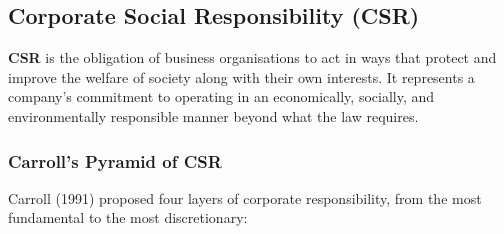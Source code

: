 \documentclass[12pt,a4paper]{article}
\begin{document}
\subsection{Corporate Social Responsibility (CSR)}

\begin{tcolorbox}[defbox, title={\textbf{Corporate Social Responsibility (CSR)}}]
\textbf{CSR} is the obligation of business organisations to act in ways that protect and improve the welfare of society along with their own interests. It represents a company's commitment to operating in an economically, socially, and environmentally responsible manner beyond what the law requires.
\end{tcolorbox}

\subsubsection{Carroll's Pyramid of CSR}
Carroll (1991) proposed four layers of corporate responsibility, from the most fundamental to the most discretionary:
\end{document}
